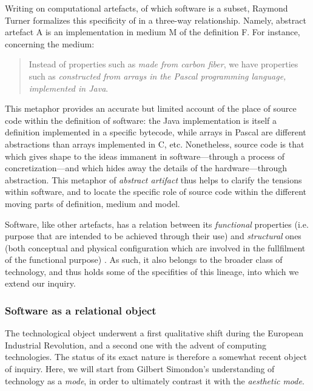 Writing on computational artefacts, of which software is a subset, Raymond Turner formalizes this specificity of in a three-way relationship. Namely, abstract artefact A is an implementation in medium M of the definition F. For instance, concerning the medium:

\begin{quote}
    Instead of properties such as \emph{made from carbon fiber}, we have properties such as \emph{constructed from arrays in the Pascal programming language, implemented in Java}. \citep{turner_computational_2018}
\end{quote}

This metaphor provides an accurate but limited account of the place of source code within the definition of software: the Java implementation is itself a definition implemented in a specific bytecode, while arrays in Pascal are different abstractions than arrays implemented in C, etc. Nonetheless, source code is that which gives shape to the ideas immanent in software—through a process of concretization—and which hides away the details of the hardware—through abstraction. This metaphor of \emph{abstract artifact} thus helps to clarify the tensions within software, and to locate the specific role of source code within the different moving parts of definition, medium and model.

Software, like other artefacts, has a relation between its \emph{functional} properties (i.e. purpose that are intended to be achieved through their use) and \emph{structural} ones (both conceptual and physical configuration which are involved in the fullfilment of the functional purpose) \citep{turner_computational_2018}. As such, it also belongs to the broader class of technology, and thus holds some of the specifities of this lineage, into which we extend our inquiry.

\subsubsection{Software as a relational object}
\label{subsubsec:software-relational}

The technological object underwent a first qualitative shift during the European Industrial Revolution, and a second one with the advent of computing technologies. The status of its exact nature is therefore a somewhat recent object of inquiry. Here, we will start from Gilbert Simondon's understanding of technology as a \emph{mode}, in order to ultimately contrast it with the \emph{aesthetic mode}.

